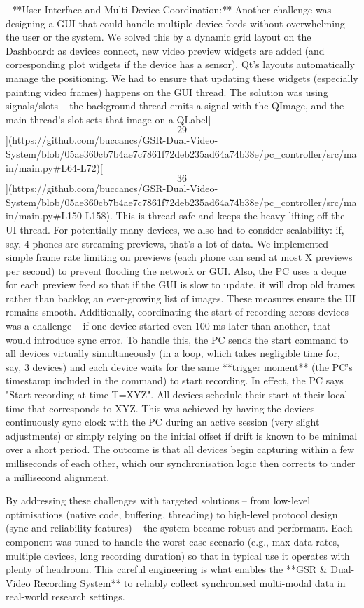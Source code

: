 \documentclass[12pt,a4paper]{article}
\begin{document}
{- **User Interface and Multi-Device Coordination:** Another challenge
  was designing a GUI that could handle multiple device feeds without
  overwhelming the user or the system. We solved this by a dynamic grid
  layout on the Dashboard: as devices connect, new video preview widgets
  are added (and corresponding plot widgets if the device has a sensor).
  Qt's layouts automatically manage the positioning. We had to ensure
  that updating these widgets (especially painting video frames) happens
  on the GUI thread. The solution was using signals/slots -- the
  background thread emits a signal with the QImage, and the main
  thread's slot sets that image on a
  QLabel[\[29\]](https://github.com/buccancs/GSR-Dual-Video-System/blob/05ae360cb7b4ae7c7861f72deb235ad64a74b38e/pc_controller/src/main/main.py#L64-L72)[\[36\]](https://github.com/buccancs/GSR-Dual-Video-System/blob/05ae360cb7b4ae7c7861f72deb235ad64a74b38e/pc_controller/src/main/main.py#L150-L158).
  This is thread-safe and keeps the heavy lifting off the UI thread. For
  potentially many devices, we also had to consider scalability: if,
  say, 4 phones are streaming previews, that's a lot of data. We
  implemented simple frame rate limiting on previews (each phone can
  send at most X previews per second) to prevent flooding the network or
  GUI. Also, the PC uses a deque for each preview feed so that if the
  GUI is slow to update, it will drop old frames rather than backlog an
  ever-growing list of images. These measures ensure the UI remains
  smooth. Additionally, coordinating the start of recording across
  devices was a challenge -- if one device started even 100 ms later
  than another, that would introduce sync error. To handle this, the PC
  sends the start command to all devices virtually simultaneously (in a
  loop, which takes negligible time for, say, 3 devices) and each device
  waits for the same **trigger moment** (the PC's timestamp included in
  the command) to start recording. In effect, the PC says "Start
  recording at time T=XYZ". All devices schedule their start at their
  local time that corresponds to XYZ. This was achieved by having the
  devices continuously sync clock with the PC during an active session
  (very slight adjustments) or simply relying on the initial offset if
  drift is known to be minimal over a short period. The outcome is that
  all devices begin capturing within a few milliseconds of each other,
  which our synchronisation logic then corrects to under a millisecond
  alignment.

By addressing these challenges with targeted solutions --
from low-level optimisations (native code, buffering, threading) to
high-level protocol design (sync and reliability features) -- the system
became robust and performant. Each component was tuned to handle the
worst-case scenario (e.g., max data rates, multiple devices, long
recording duration) so that in typical use it operates with plenty of
headroom. This careful engineering is what enables the **GSR &
Dual-Video Recording System** to reliably collect synchronised
multi-modal data in real-world research settings.

}
\end{document}
